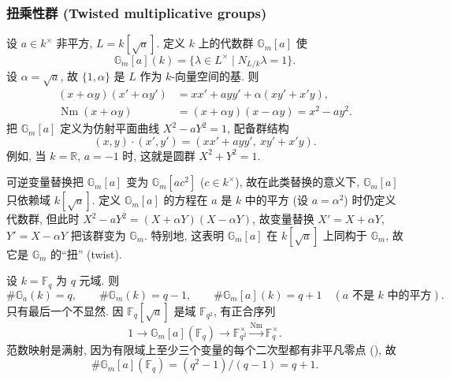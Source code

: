 \subsubsection{扭乘性群 (Twisted multiplicative groups)}\label{subsec:twisted-multiplicative} 设 $a\in k^{\times}$ 非平方, $L = k[\sqrt{a}]$. 定义 $k$ 上的代数群 $\mathbb{G}_m[a]$ 使
\[
\mathbb{G}_m[a](k) = \{\lambda\in L^{\times} \mid N_{L/k}\lambda = 1\}.
\]
设 $\alpha = \sqrt{a}$, 故 $\{1,\alpha\}$ 是 $L$ 作为 $k$-向量空间的基. 则
\begin{align*}
(x+\alpha y)(x'+\alpha y') &= xx' + ayy' + \alpha(xy' + x'y),\\
\operatorname{Nm}(x+\alpha y) &= (x+\alpha y)(x-\alpha y) = x^2 - ay^2.
\end{align*}
把 $\mathbb{G}_m[a]$ 定义为仿射平面曲线 $X^2 - aY^2 = 1$, 配备群结构
\[
(x,y)\cdot(x',y') = (xx' + ayy',\ xy' + x'y).
\]
例如, 当 $k = \mathbb{R}$, $a = -1$ 时, 这就是圆群 $X^2 + Y^2 = 1$.

可逆变量替换把 $\mathbb{G}_m[a]$ 变为 $\mathbb{G}_m[ac^2]$ ($c\in k^{\times}$), 故在此类替换的意义下, $\mathbb{G}_m[a]$ 只依赖域 $k[\sqrt{a}]$. 定义 $\mathbb{G}_m[a]$ 的方程在 $a$ 是 $k$ 中的平方 (设 $a = \alpha^2$) 时仍定义代数群, 但此时 $X^2 - aY^2 = (X+\alpha Y)(X-\alpha Y)$, 故变量替换 $X' = X+\alpha Y$, $Y' = X-\alpha Y$ 把该群变为 $\mathbb{G}_m$. 特别地, 这表明 $\mathbb{G}_m[a]$ 在 $k[\sqrt{a}]$ 上同构于 $\mathbb{G}_m$, 故它是 $\mathbb{G}_m$ 的``扭'' (twist).

\begin{remark} \label{thm:2.3.1} 
设 $k = \mathbb{F}_q$ 为 $q$ 元域. 则
\[
\#\mathbb{G}_a(k) = q, \qquad \#\mathbb{G}_m(k) = q-1, \qquad \#\mathbb{G}_m[a](k) = q+1 \quad (\text{$a$ 不是 $k$ 中的平方}).
\]
只有最后一个不显然. 因 $\mathbb{F}_q[\sqrt{a}]$ 是域 $\mathbb{F}_{q^2}$, 有正合序列
\[
1\to\mathbb{G}_m[a](\mathbb{F}_q)\to\mathbb{F}_{q^2}^{\times}\xrightarrow{\operatorname{Nm}}\mathbb{F}_q^{\times}.
\]
范数映射是满射, 因为有限域上至少三个变量的每个二次型都有非平凡零点 (\cite[I, \S2]{serre1973}), 故
\[
\#\mathbb{G}_m[a](\mathbb{F}_q) = (q^2-1)/(q-1) = q+1.
\]
\end{remark}

